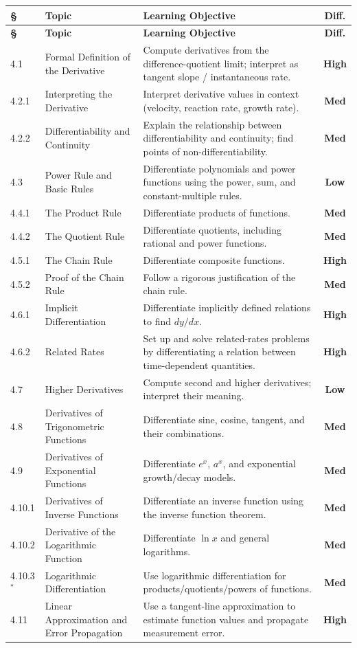 \documentclass[11pt]{article}
\newcommand{\diffL}{\textcolor{diffgreenc}{\textbf{Low}}}
\newcommand{\diffM}{\textcolor{diffamberc}{\textbf{Med}}}
\newcommand{\diffH}{\textcolor{diffredc}{\textbf{High}}}
\newcommand{\opt}{$^{\ast}$}
\begin{document}
\begin{longtable}{P{1.6cm}P{4.6cm}P{7.3cm}c}
\toprule
\textbf{\S} & \textbf{Topic} & \textbf{Learning Objective} & \textbf{Diff.} \\
\midrule
\endfirsthead
\toprule
\textbf{\S} & \textbf{Topic} & \textbf{Learning Objective} & \textbf{Diff.} \\
\midrule
{} & Formal Definition of the Derivative & Compute derivatives from the difference-quotient limit; interpret as tangent slope / instantaneous rate. & \diffH \\
4.2.1 & Interpreting the Derivative & Interpret derivative values in context (velocity, reaction rate, growth rate). & \diffM \\
4.2.2 & Differentiability and Continuity & Explain the relationship between differentiability and continuity; find points of non-differentiability. & \diffM \\
4.3 & Power Rule and Basic Rules & Differentiate polynomials and power functions using the power, sum, and constant-multiple rules. & \diffL \\
4.4.1 & The Product Rule & Differentiate products of functions. & \diffM \\
4.4.2 & The Quotient Rule & Differentiate quotients, including rational and power functions. & \diffM \\
4.5.1 & The Chain Rule & Differentiate composite functions. & \diffH \\
4.5.2 & Proof of the Chain Rule & Follow a rigorous justification of the chain rule. & \diffM \\
4.6.1 & Implicit Differentiation & Differentiate implicitly defined relations to find $dy/dx$. & \diffH \\
4.6.2 & Related Rates & Set up and solve related-rates problems by differentiating a relation between time-dependent quantities. & \diffH \\
4.7 & Higher Derivatives & Compute second and higher derivatives; interpret their meaning. & \diffL \\
4.8 & Derivatives of Trigonometric Functions & Differentiate sine, cosine, tangent, and their combinations. & \diffM \\
4.9 & Derivatives of Exponential Functions & Differentiate $e^{x}$, $a^{x}$, and exponential growth/decay models. & \diffM \\
4.10.1 & Derivatives of Inverse Functions & Differentiate an inverse function using the inverse function theorem. & \diffM \\
4.10.2 & Derivative of the Logarithmic Function & Differentiate $\ln x$ and general logarithms. & \diffM \\
4.10.3\opt & Logarithmic Differentiation & Use logarithmic differentiation for products/quotients/powers of functions. & \diffM \\
4.11 & Linear Approximation and Error Propagation & Use a tangent-line approximation to estimate function values and propagate measurement error. & \diffH \\
\bottomrule
\end{longtable}
\end{document}
